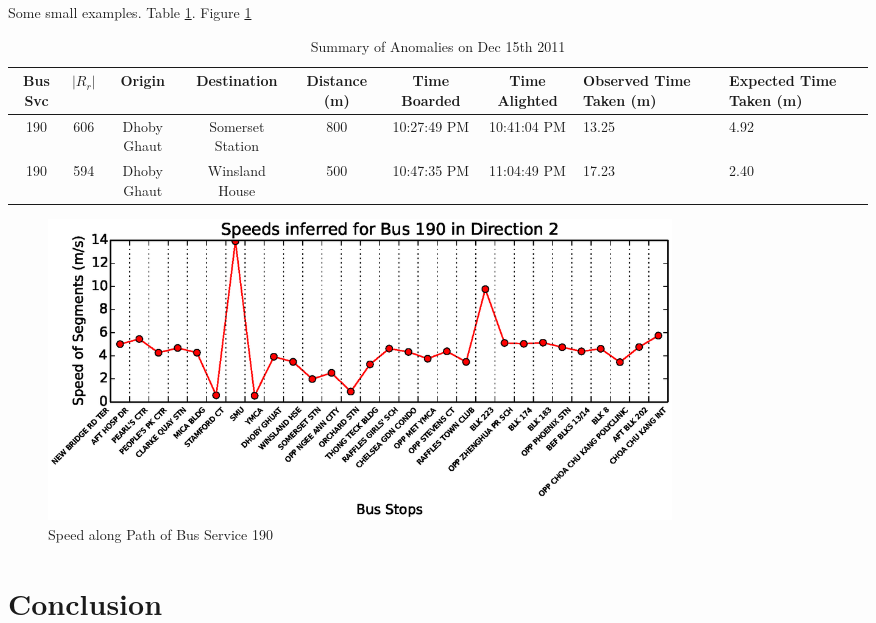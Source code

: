 \documentclass[draft]{sig-alternate}
\begin{document}
Some small examples. Table \ref{tbl:anomalies}. Figure \ref{fig:190_2_speed}

\begin{table}[htb]
	\small
	\centering
	\caption{Summary of Anomalies on Dec 15th 2011}
	\label{tbl:anomalies}
	\begin{tabular}{|c|c|c|c|c|c|c|p{1.5cm}|p{1.5cm}|}
		\hline
		Bus Svc & $|R_r|$ & Origin & Destination & Distance (m) & Time Boarded & Time Alighted & Observed Time Taken (m) & Expected Time Taken (m) \\
		\hline
		190 & 606 & Dhoby Ghaut & Somerset Station & 800 & 10:27:49 PM & 10:41:04 PM & 13.25 & 4.92 \\
		\hline
		190 & 594 & Dhoby Ghaut & Winsland House & 500 & 10:47:35 PM & 11:04:49 PM & 17.23 & 2.40 \\
		\hline
	\end{tabular}
\end{table}

\begin{figure}[htb]
	\centering
	\includegraphics[width=6.5in]{190_2_speed}
	\caption{Speed along Path of Bus Service 190}
	\label{fig:190_2_speed}
\end{figure}

\section{Conclusion}



\end{document}
